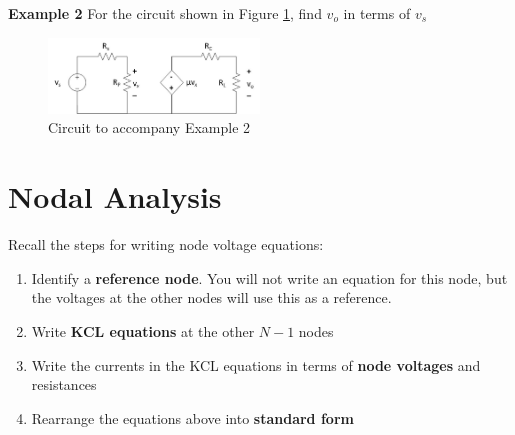 \documentclass{handout}
\begin{document}


\newpage
\clearpage
\pagebreak

\textbf{Example 2}
For the circuit shown in Figure \ref{fig: Example2}, find $v_o$ in terms of $v_s$

\begin{figure}[h! t! b!]
\centering
\includegraphics[width=0.5\textwidth]{Example2.jpg}
\caption{Circuit to accompany Example 2}
\label{fig: Example2}
\end{figure}



\newpage
\clearpage
\pagebreak

\section{Nodal Analysis}
Recall the steps for writing node voltage equations:
\begin{enumerate}
	\item Identify a \textbf{reference node}.  You will not write an equation for this node, but the voltages at the other nodes will use this as a reference.
	\item Write \textbf{KCL equations} at the other $N-1$ nodes
	\item Write the currents in the KCL equations in terms of \textbf{node voltages} and resistances
	\item Rearrange the equations above into \textbf{standard form}
\end{enumerate}
\end{document}
